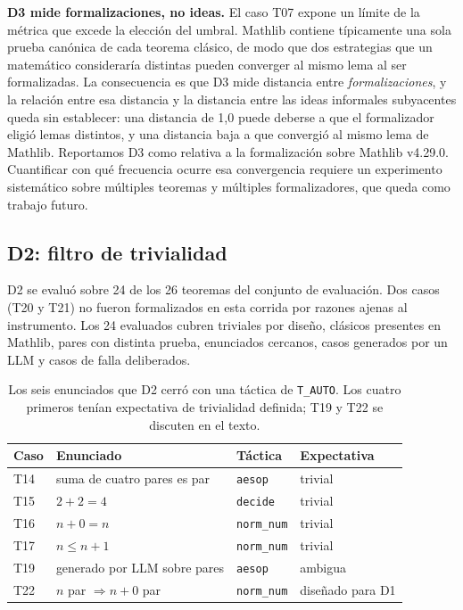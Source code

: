 \documentclass[12pt,a4paper]{article}
\theoremstyle{remark}
\begin{document}
\textbf{D3 mide formalizaciones, no ideas.} El caso T07 expone un límite de la métrica que excede la elección del umbral. Mathlib contiene típicamente una sola prueba canónica de cada teorema clásico, de modo que dos estrategias que un matemático consideraría distintas pueden converger al mismo lema al ser formalizadas. La consecuencia es que D3 mide distancia entre \textit{formalizaciones}, y la relación entre esa distancia y la distancia entre las ideas informales subyacentes queda sin establecer: una distancia de 1{,}0 puede deberse a que el formalizador eligió lemas distintos, y una distancia baja a que convergió al mismo lema de Mathlib. Reportamos D3 como relativa a la formalización sobre Mathlib v4.29.0. Cuantificar con qué frecuencia ocurre esa convergencia requiere un experimento sistemático sobre múltiples teoremas y múltiples formalizadores, que queda como trabajo futuro.

\subsection{D2: filtro de trivialidad}

D2 se evaluó sobre 24 de los 26 teoremas del conjunto de evaluación. Dos casos (T20 y T21) no fueron formalizados en esta corrida por razones ajenas al instrumento. Los 24 evaluados cubren triviales por diseño, clásicos presentes en Mathlib, pares con distinta prueba, enunciados cercanos, casos generados por un LLM y casos de falla deliberados.

\begin{table}[htbp]
\centering
\small
\setlength{\tabcolsep}{5pt}
\begin{tabular}{llll}
\toprule
Caso & Enunciado & Táctica & Expectativa \\
\midrule
T14 & suma de cuatro pares es par        & \texttt{aesop}    & trivial \\
T15 & $2 + 2 = 4$                        & \texttt{decide}   & trivial \\
T16 & $n + 0 = n$                        & \texttt{norm\_num} & trivial \\
T17 & $n \leq n + 1$                     & \texttt{norm\_num} & trivial \\
T19 & generado por LLM sobre pares       & \texttt{aesop}    & ambigua \\
T22 & $n$ par $\Rightarrow n+0$ par      & \texttt{norm\_num} & diseñado para D1 \\
\bottomrule
\end{tabular}
\caption{Los seis enunciados que D2 cerró con una táctica de \texttt{T\_AUTO}. Los cuatro primeros tenían expectativa de trivialidad definida; T19 y T22 se discuten en el texto.}
\label{tab:d2trivial}
\end{table}
\end{document}
